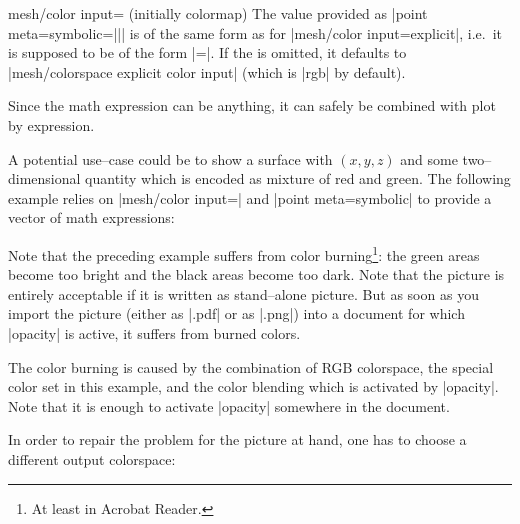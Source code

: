 {{\begin{pgfplotskey}{mesh/color input= (initially colormap)}
The value provided as |point meta={symbolic=||}| is of the same form as for |mesh/color input=explicit|, i.e.\ it is supposed to be of the form |=|. If the  is omitted, it defaults to |mesh/colorspace explicit color input| (which is |rgb| by default).

Since the math expression can be anything, it can safely be combined with plot by expression.

A potential use--case could be to show a surface with $(x,y,z)$ and some two--dimensional quantity which is encoded as mixture of red and green. The following example relies on |mesh/color input=| and |point meta=symbolic| to provide a vector of math expressions:
\pgfplotsexpensiveexample
\begin{codeexample}[]
\end{codeexample}
\noindent Note that the preceding example suffers from color burning\footnote{At least in Acrobat Reader.}: the green areas become too bright and the black areas become too dark. Note that the picture is entirely acceptable if it is written as stand--alone picture. But as soon as you import the picture (either as |.pdf| or as |.png|) into a document for which |opacity| is active, it suffers from burned colors. 

The color burning is caused by the combination of RGB colorspace, the special color set in this example, and the color blending which is activated by |opacity|. Note that it is enough to activate |opacity| somewhere in the document. 

In order to repair the problem for the picture at hand, one has to choose a different output colorspace:


\end{pgfplotskey}}}
